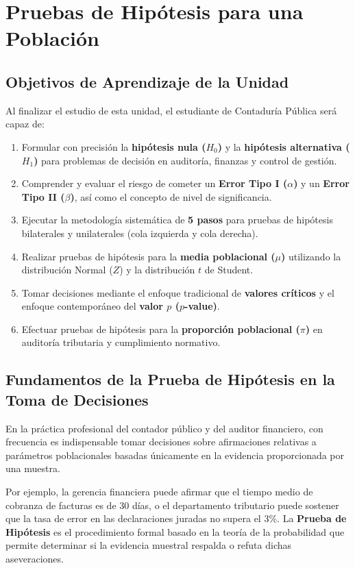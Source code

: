 \chapter{Pruebas de Hipótesis para una Población}
\label{cap:pruebas_hipotesis}

\section*{Objetivos de Aprendizaje de la Unidad}
Al finalizar el estudio de esta unidad, el estudiante de Contaduría Pública será capaz de:
\begin{enumerate}
    \item Formular con precisión la \textbf{hipótesis nula ($H_0$)} y la \textbf{hipótesis alternativa ($H_1$)} para problemas de decisión en auditoría, finanzas y control de gestión.
    \item Comprender y evaluar el riesgo de cometer un \textbf{Error Tipo I ($\alpha$)} y un \textbf{Error Tipo II ($\beta$)}, así como el concepto de nivel de significancia.
    \item Ejecutar la metodología sistemática de \textbf{5 pasos} para pruebas de hipótesis bilaterales y unilaterales (cola izquierda y cola derecha).
    \item Realizar pruebas de hipótesis para la \textbf{media poblacional ($\mu$)} utilizando la distribución Normal ($Z$) y la distribución $t$ de Student.
    \item Tomar decisiones mediante el enfoque tradicional de \textbf{valores críticos} y el enfoque contemporáneo del \textbf{valor $p$ ($p$-value)}.
    \item Efectuar pruebas de hipótesis para la \textbf{proporción poblacional ($\pi$)} en auditoría tributaria y cumplimiento normativo.
\end{enumerate}

\section{Fundamentos de la Prueba de Hipótesis en la Toma de Decisiones}
En la práctica profesional del contador público y del auditor financiero, con frecuencia es indispensable tomar decisiones sobre afirmaciones relativas a parámetros poblacionales basadas únicamente en la evidencia proporcionada por una muestra.

Por ejemplo, la gerencia financiera puede afirmar que el tiempo medio de cobranza de facturas es de 30 días, o el departamento tributario puede sostener que la tasa de error en las declaraciones juradas no supera el 3\%. La \textbf{Prueba de Hipótesis} es el procedimiento formal basado en la teoría de la probabilidad que permite determinar si la evidencia muestral respalda o refuta dichas aseveraciones.

